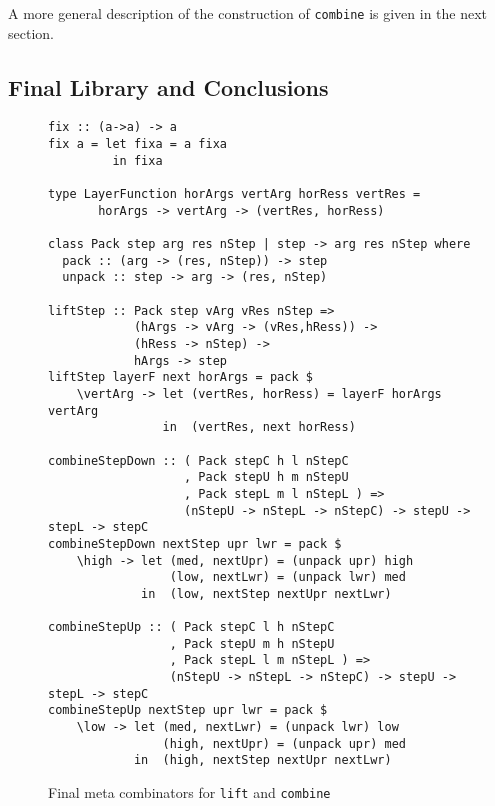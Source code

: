 \par A more general description of the construction of \texttt{combine} is
        given in the next section.
\subsection{Final Library and Conclusions}

\begin{figure}
\begin{small}
\begin{center}
\begin{footnotesize}
\begin{verbatim}
fix :: (a->a) -> a
fix a = let fixa = a fixa
         in fixa

type LayerFunction horArgs vertArg horRess vertRes =
       horArgs -> vertArg -> (vertRes, horRess)

class Pack step arg res nStep | step -> arg res nStep where
  pack :: (arg -> (res, nStep)) -> step
  unpack :: step -> arg -> (res, nStep)

liftStep :: Pack step vArg vRes nStep => 
            (hArgs -> vArg -> (vRes,hRess)) ->
            (hRess -> nStep) -> 
            hArgs -> step
liftStep layerF next horArgs = pack $
    \vertArg -> let (vertRes, horRess) = layerF horArgs vertArg                     
                in  (vertRes, next horRess)

combineStepDown :: ( Pack stepC h l nStepC 
                   , Pack stepU h m nStepU
                   , Pack stepL m l nStepL ) => 
                   (nStepU -> nStepL -> nStepC) -> stepU -> stepL -> stepC
combineStepDown nextStep upr lwr = pack $
    \high -> let (med, nextUpr) = (unpack upr) high
                 (low, nextLwr) = (unpack lwr) med
             in  (low, nextStep nextUpr nextLwr)

combineStepUp :: ( Pack stepC l h nStepC 
                 , Pack stepU m h nStepU
                 , Pack stepL l m nStepL ) => 
                 (nStepU -> nStepL -> nStepC) -> stepU -> stepL -> stepC
combineStepUp nextStep upr lwr = pack $
    \low -> let (med, nextLwr) = (unpack lwr) low
                (high, nextUpr) = (unpack upr) med
            in  (high, nextStep nextUpr nextLwr)
\end{verbatim}
\end{footnotesize}\caption{Final meta combinators for \texttt{lift} and
      \texttt{combine}}\label{metacombinators} 
\end{center}
\end{small}
\end{figure}

